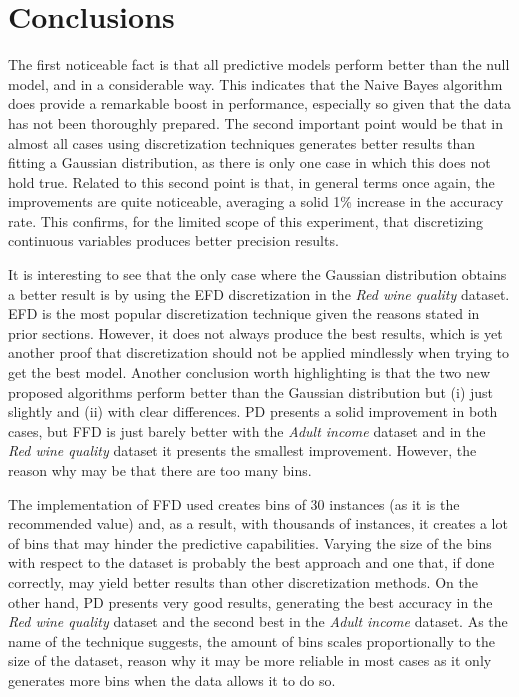 \documentclass{article}
\begin{document}
\section{Conclusions}

The first noticeable fact is that all predictive models perform better than the null model, and in a considerable way. This indicates that the Naive Bayes algorithm does provide a remarkable boost in performance, especially so given that the data has not been thoroughly prepared. The second important point would be that in almost all cases using discretization techniques generates better results than fitting a Gaussian distribution, as there is only one case in which this does not hold true. Related to this second point is that, in general terms once again, the improvements are quite noticeable, averaging a solid 1\% increase in the accuracy rate. This confirms, for the limited scope of this experiment, that discretizing continuous variables produces better precision results.

It is interesting to see that the only case where the Gaussian distribution obtains a better result is by using the EFD discretization in the \emph{Red wine quality} dataset. EFD is the most popular discretization technique given the reasons stated in prior sections. However, it does not always produce the best results, which is yet another proof that discretization should not be applied mindlessly when trying to get the best model. Another conclusion worth highlighting is that the two new proposed algorithms perform better than the Gaussian distribution but (i) just slightly and (ii) with clear differences. PD presents a solid improvement in both cases, but FFD is just barely better with the \emph{Adult income} dataset and in the \emph{Red wine quality} dataset it presents the smallest improvement. However, the reason why may be that there are too many bins. 

The implementation of FFD used creates bins of 30 instances (as it is the recommended value) and, as a result, with thousands of instances, it creates a lot of bins that may hinder the predictive capabilities. Varying the size of the bins with respect to the dataset is probably the best approach and one that, if done correctly, may yield better results than other discretization methods. On the other hand, PD presents very good results, generating the best accuracy in the \emph{Red wine quality} dataset and the second best in the \emph{Adult income} dataset. As the name of the technique suggests, the amount of bins scales proportionally to the size of the dataset, reason why it may be more reliable in most cases as it only generates more bins when the data allows it to do so. 
\end{document}
